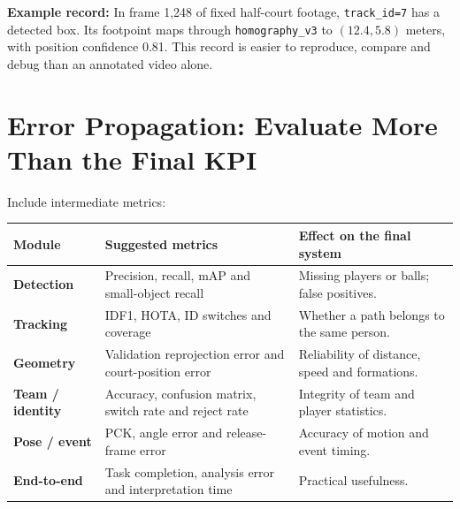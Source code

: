 \documentclass[11pt,a4paper,oneside]{report}
\begin{document}
\begin{plainBox}
\textbf{Example record:} In frame 1,248 of fixed half-court footage, \texttt{track\_id=7} has a detected box. Its footpoint maps through \texttt{homography\_v3} to $(12.4, 5.8)$ meters, with position confidence 0.81. This record is easier to reproduce, compare and debug than an annotated video alone.
\end{plainBox}

\section{Error Propagation: Evaluate More Than the Final KPI}

\begin{center}
\begin{adjustbox}{max width=\linewidth}
\end{adjustbox}
\end{center}

Include intermediate metrics:

\begin{tabularx}{\textwidth}{>{\bfseries\RaggedRight}p{3cm} Y Y}
\toprule
Module & Suggested metrics & Effect on the final system \\
\midrule
Detection & Precision, recall, mAP and small-object recall & Missing players or balls; false positives.\\
Tracking & IDF1, HOTA, ID switches and coverage & Whether a path belongs to the same person.\\
Geometry & Validation reprojection error and court-position error & Reliability of distance, speed and formations.\\
Team / identity & Accuracy, confusion matrix, switch rate and reject rate & Integrity of team and player statistics.\\
Pose / event & PCK, angle error and release-frame error & Accuracy of motion and event timing.\\
End-to-end & Task completion, analysis error and interpretation time & Practical usefulness.\\
\bottomrule
\end{tabularx}
\end{document}
